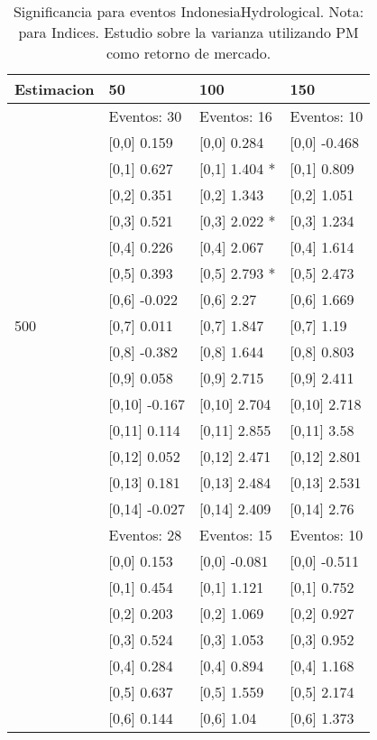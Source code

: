 \begin{table}

\caption{Significancia para eventos IndonesiaHydrological. Nota: para Indices. Estudio sobre la varianza utilizando PM como retorno de mercado.}
\centering
\begin{tabular}[t]{llll}
\toprule
Estimacion & 50 & 100 & 150\\
\midrule
 & Eventos:  30 & Eventos:  16 & Eventos:  10\\
 & {}[0,0] 0.159 & {}[0,0] 0.284 & {}[0,0] -0.468\\
 & {}[0,1] 0.627 & {}[0,1] 1.404 * & {}[0,1] 0.809\\
 & {}[0,2] 0.351 & {}[0,2] 1.343 & {}[0,2] 1.051\\
 & {}[0,3] 0.521 & {}[0,3] 2.022 * & {}[0,3] 1.234\\
\addlinespace
 & {}[0,4] 0.226 & {}[0,4] 2.067 & {}[0,4] 1.614\\
 & {}[0,5] 0.393 & {}[0,5] 2.793 * & {}[0,5] 2.473\\
 & {}[0,6] -0.022 & {}[0,6] 2.27 & {}[0,6] 1.669\\
500 & {}[0,7] 0.011 & {}[0,7] 1.847 & {}[0,7] 1.19\\
 & {}[0,8] -0.382 & {}[0,8] 1.644 & {}[0,8] 0.803\\
\addlinespace
 & {}[0,9] 0.058 & {}[0,9] 2.715 & {}[0,9] 2.411\\
 & {}[0,10] -0.167 & {}[0,10] 2.704 & {}[0,10] 2.718\\
 & {}[0,11] 0.114 & {}[0,11] 2.855 & {}[0,11] 3.58\\
 & {}[0,12] 0.052 & {}[0,12] 2.471 & {}[0,12] 2.801\\
 & {}[0,13] 0.181 & {}[0,13] 2.484 & {}[0,13] 2.531\\
\addlinespace
 & {}[0,14] -0.027 & {}[0,14] 2.409 & {}[0,14] 2.76\\
 & Eventos:  28 & Eventos:  15 & Eventos:  10\\
 & {}[0,0] 0.153 & {}[0,0] -0.081 & {}[0,0] -0.511\\
 & {}[0,1] 0.454 & {}[0,1] 1.121 & {}[0,1] 0.752\\
 & {}[0,2] 0.203 & {}[0,2] 1.069 & {}[0,2] 0.927\\
\addlinespace
 & {}[0,3] 0.524 & {}[0,3] 1.053 & {}[0,3] 0.952\\
 & {}[0,4] 0.284 & {}[0,4] 0.894 & {}[0,4] 1.168\\
 & {}[0,5] 0.637 & {}[0,5] 1.559 & {}[0,5] 2.174\\
 & {}[0,6] 0.144 & {}[0,6] 1.04 & {}[0,6] 1.373\\

\end{tabular}
\end{table}

